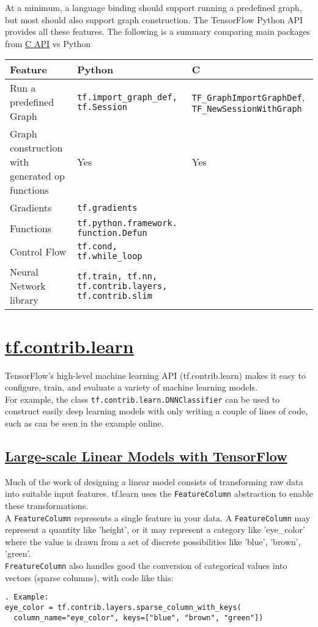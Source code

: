 \documentclass[11pt,a4paper]{article}
\begin{document}
At a minimum, a language binding should support running a predefined graph, but most should also support graph construction. The TensorFlow Python API provides all these features.
The following is a summary comparing main packages from \href{https://www.tensorflow.org/code/tensorflow/c/c_api.h}{C API} vs Python \\
\begin{tabular}{|p{3cm}|p{6cm}|p{5cm}|}
  \hline 
  \textbf{Feature} & \textbf{Python} & \textbf{C} \\ 
  \hline 
  Run a predefined Graph & \texttt{tf.import\_graph\_def, tf.Session} & \texttt{TF\_GraphImportGraphDef}, \texttt{TF\_NewSessionWithGraph} \\ 
  \hline 
  Graph construction with generated op functions & Yes & Yes \\ 
  \hline 
  Gradients & \texttt{tf.gradients} & \  \\ 
  \hline 
  Functions & \texttt{tf.python.framework. function.Defun} & \ \\ 
  \hline 
  Control Flow & \texttt{tf.cond, tf.while\_loop} & \ \\ 
  \hline 
  Neural Network library & \texttt{tf.train, tf.nn, tf.contrib.layers, tf.contrib.slim} & \ \\ 
  \hline 
  \end{tabular}   
  
\section{\href{https://www.tensorflow.org/versions/r0.11/tutorials/tflearn/index.html}{tf.contrib.learn}} 
TensorFlow’s high-level machine learning API (tf.contrib.learn) makes it easy to configure, train, and evaluate a variety of machine learning models.\\
For example, the class \texttt{tf.contrib.learn.DNNClassifier} can be used to construct easily deep learning models with only writing a couple of lines of code, such as can be seen in the example online. 

\subsection{\href{www.tensorflow.org/versions/r0.11/tutorials/linear/overview.html}{Large-scale Linear Models with TensorFlow}}
Much of the work of designing a linear model consists of transforming raw data into suitable input features. tf.learn uses the \texttt{FeatureColumn} abstraction to enable these transformations. \\
A \texttt{FeatureColumn} represents a single feature in your data. A \texttt{FeatureColumn} may represent a quantity like 'height', or it may represent a category like 'eye\_color' where the value is drawn from a set of discrete possibilities like {'blue', 'brown', 'green'}. \\
\texttt{FreatureColumn} also handles good the conversion of categorical values into vectors (sparse columns), with code like this: 
\begin{lstlisting}. Example: 
eye_color = tf.contrib.layers.sparse_column_with_keys(
  column_name="eye_color", keys=["blue", "brown", "green"])   
\end{lstlisting}
\end{document}

